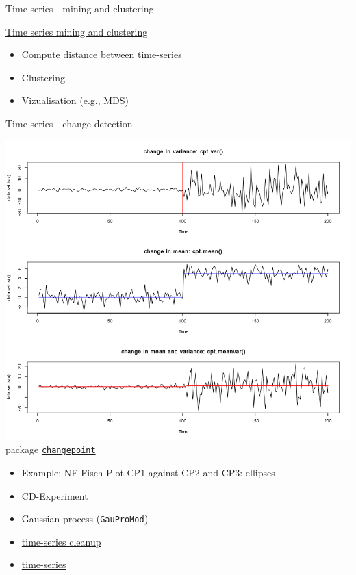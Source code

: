 \documentclass[8pt,ignorenonframetext,]{beamer}
\providecommand{\tightlist}{%
  \setlength{\itemsep}{0pt}\setlength{\parskip}{0pt}}
\begin{document}
\begin{frame}{Time series - mining and clustering}

\href{https://rdatamining.wordpress.com/2011/08/23/time-series-analysis-and-mining-with-r/}{Time
series mining and clustering}

\begin{itemize}
\tightlist
\item
  Compute distance between time-series
\item
  Clustering
\item
  Vizualisation (e.g., MDS)
\end{itemize}

\end{frame}

\begin{frame}[fragile]{Time series - change detection}

\includegraphics{imgPres/TS_changedetection.png} package
\href{https://cran.r-project.org/web/packages/changepoint}{\texttt{changepoint}}

\begin{itemize}
\tightlist
\item
  Example: NF-Fisch Plot CP1 against CP2 and CP3: ellipses
\item
  CD-Experiment
\item
  Gaussian process (\texttt{GauProMod})
\item
  \href{https://cran.r-project.org/web/packages/waterData/vignettes/vignette.pdf}{time-series
  cleanup}
\item
  \href{http://www.css.cornell.edu/faculty/dgr2/teach/R/R_ts.pdf}{time-series}
\end{itemize}

\end{frame}
\end{document}
